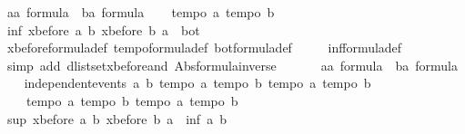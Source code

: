 \begin{isabellebody}
\ a{\isacharcolon}{\isacharcolon}{\isachardoublequoteopen}{\isacharprime}a\ formula{\isachardoublequoteclose}\ \ b{\isacharcolon}{\isacharcolon}{\isachardoublequoteopen}{\isacharprime}a\ formula{\isachardoublequoteclose}\isanewline
\ \ \isamarkupfalse%
\ {\isachardoublequoteopen}tempo{}\ a{\isachardoublequoteclose}\ {\isachardoublequoteopen}tempo{}\ b{\isachardoublequoteclose}\ \isanewline
\ \ \isamarkupfalse%
\ {\isachardoublequoteopen}inf\ {\isacharparenleft}xbefore\ a\ b{\isacharparenright}\ {\isacharparenleft}xbefore\ b\ a{\isacharparenright}\ {\isacharequal}\ bot{\isachardoublequoteclose}\isanewline
\ \ \isamarkupfalse%
\ xbefore{\isacharunderscore}formula{\isacharunderscore}def\ tempo{}{\isacharunderscore}formula{\isacharunderscore}def\ bot{\isacharunderscore}formula{\isacharunderscore}def\ \isanewline
\ \ \ \ inf{\isacharunderscore}formula{\isacharunderscore}def\isanewline
\ \ \isamarkupfalse%
\ {\isacharparenleft}simp\ add{\isacharcolon}\ dlistset{\isacharunderscore}xbefore{\isacharunderscore}and\ Abs{\isacharunderscore}formula{\isacharunderscore}inverse{\isacharparenright}\isanewline
\ \ \isamarkupfalse%
\isanewline
\ \ \isamarkupfalse%
\ a{\isacharcolon}{\isacharcolon}{\isachardoublequoteopen}{\isacharprime}a\ formula{\isachardoublequoteclose}\ \ b{\isacharcolon}{\isacharcolon}{\isachardoublequoteopen}{\isacharprime}a\ formula{\isachardoublequoteclose}\isanewline
\ \ \isamarkupfalse%
\ {\isachardoublequoteopen}independent{\isacharunderscore}events\ a\ b{\isachardoublequoteclose}\ {\isachardoublequoteopen}tempo{}\ a{\isachardoublequoteclose}\ {\isachardoublequoteopen}tempo{}\ b{\isachardoublequoteclose}\ {\isachardoublequoteopen}tempo{}\ a{\isachardoublequoteclose}\ {\isachardoublequoteopen}tempo{}\ b{\isachardoublequoteclose}\isanewline
\ \ \ \ {\isachardoublequoteopen}tempo{}\ a{\isachardoublequoteclose}\ {\isachardoublequoteopen}tempo{}\ b{\isachardoublequoteclose}\ {\isachardoublequoteopen}tempo{}\ a{\isachardoublequoteclose}\ {\isachardoublequoteopen}tempo{}\ b{\isachardoublequoteclose}\isanewline
\ \ \isamarkupfalse%
\ {\isachardoublequoteopen}sup\ {\isacharparenleft}xbefore\ a\ b{\isacharparenright}\ {\isacharparenleft}xbefore\ b\ a{\isacharparenright}\ {\isacharequal}\ inf\ a\ b{\isachardoublequoteclose}\isanewline
\ \ \isamarkupfalse%

\end{isabellebody}
